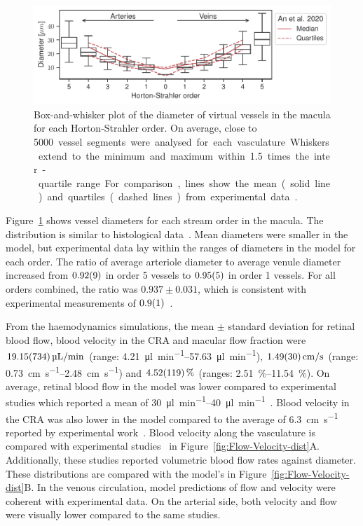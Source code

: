 \documentclass[11pt,]{article}
\begin{document}
\begin{figure}[ht!]
  \centering
  \includegraphics[width=.95\textwidth]{Horton_Strahler_Diameter_Distribution}
  \caption{\label{fig:Horton_Strahler}Box-and-whisker plot of the diameter of virtual vessels in the macula for each Horton-Strahler order. On average, close to \SI{5000} vessel segments were analysed for each vasculature. Whiskers extend to the minimum and maximum within \SI{1.5}{} times the inter-quartile range. For comparison, lines show the mean (solid line) and quartiles (dashed lines) from experimental data\cite{An2020}.}  
\end{figure}

Figure~\ref{fig:Horton_Strahler} shows vessel diameters for each stream order in the macula.
The distribution is similar to histological data~\cite{An2020}.
Mean diameters were smaller in the model, but experimental data lay within the ranges of diameters in the model for each order.
The ratio of average arteriole diameter to average venule diameter increased from $\SI{0.92\pm 0.09}{}$ in order 5 vessels to $\SI{0.95\pm0.05}{}$ in order 1 vessels.
For all orders combined, the ratio was $0.937\pm0.031$, which is consistent with experimental measurements of $\SI{0.9\pm0.1}{}$~\cite{Goldenberg2013}.  

From the haemodynamics simulations, the mean $\pm$ standard deviation for retinal blood flow, blood velocity in the CRA and macular flow fraction were $\SI[per-mode=symbol]{19.15\pm7.34}{\micro\litre\per\minute}$ (range: \SIrange[per-mode=symbol]{4.21}{57.63}{\micro\litre\per\minute}), $\SI[per-mode=symbol]{1.49\pm0.30}{\cm\per\second}$ (range: \SIrange[per-mode=symbol]{0.73}{2.48}{\cm\per\second}) and $\SI{4.52\pm1.19}{\percent}$ (ranges: \SIrange{2.51}{11.54}{\percent}).
On average, retinal blood flow in the model was lower compared to experimental studies which reported a mean of \SIrange{30}{40}{\micro\litre\per\minute}~\cite{DoblhoffDier2014,Riva1985}.
Blood velocity in the CRA was also lower in the model compared to the average of \SI{6.3}{\cm\per\second} reported by experimental work~\cite{Dorner2009}.
Blood velocity along the vasculature is compared with experimental studies~\cite{DoblhoffDier2014,Riva1985} in Figure~\ref{fig:Flow-Velocity-dist}A.
Additionally, these studies reported volumetric blood flow rates against diameter.
These distributions are compared with the model's in Figure~\ref{fig:Flow-Velocity-dist}B.
In the venous circulation, model predictions of flow and velocity were coherent with experimental data.
On the arterial side, both velocity and flow were visually lower compared to the same studies.
\end{document}
